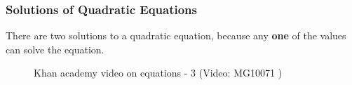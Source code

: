             \subsubsection{  Solutions of Quadratic Equations }
            \nopagebreak
        \label{m39247*id150373}There are two solutions to a
quadratic equation, because any \textbf{one} of the values can solve the
equation. \par 
\label{m39247*eip-388}
    \setcounter{subfigure}{0}
	\begin{figure}[H] %
    \textnormal{Khan academy video on equations - 3}\vspace{.1in} \nopagebreak
  \label{m39247*yt-media3}\label{m39247*yt-video3}
             { (Video:  MG10071 )}
      \vspace{2pt}
    \vspace{.1in}
 \end{figure}       \par \label{m39247*secfhsst!!!underscore!!!id2133}\vspace{.5cm} 
      \noindent
